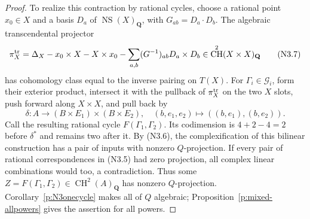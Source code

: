 \documentclass[11pt,reqno]{article}
\theoremstyle{emphasizedplain}
\theoremstyle{emphasizeddefinition}
\theoremstyle{emphasizeddefinition}
\DeclareMathOperator{\NS}{NS}
\DeclareMathOperator{\CH}{CH}
\newcommand{\Q}{\mathbf Q}
\begin{document}
\begin{proof}
To realize this contraction by rational cycles, choose a rational
point $x_0\in X$ and a basis $D_a$ of $\NS(X)_\Q$, with
$G_{ab}=D_a\cdot D_b$. The algebraic transcendental projector
\[
 \pi_X^{\rm tr}=\Delta_X-x_0\times X-X\times x_0
   -\sum_{a,b}(G^{-1})_{ab}D_a\times D_b
   \in\CH^2(X\times X)_\Q                          \tag{N3.7}
\]
has cohomology class equal to the inverse pairing on $T(X)$.
For $\Gamma_i\in\mathcal G_i$, form their exterior product,
intersect it with the pullback of $\pi_X^{\rm tr}$ on the two
$X$ slots, push forward along $X\times X$, and pull back by
\[
 \delta:A\longrightarrow(B\times E_1)\times(B\times E_2),
 \quad(b,e_1,e_2)\longmapsto((b,e_1),(b,e_2)).
\]
Call the resulting rational cycle $F(\Gamma_1,\Gamma_2)$.
Its codimension is $4+2-4=2$ before $\delta^*$ and remains two
after it. By (N3.6), the complexification of this bilinear
construction has a pair of inputs with nonzero $Q$-projection.
If every pair of rational correspondences in (N3.5) had zero
projection, all complex linear combinations would too, a
contradiction. Thus some
$Z=F(\Gamma_1,\Gamma_2)\in\CH^2(A)_\Q$ has nonzero
$Q$-projection. Corollary~\ref{p:N3onecycle} makes all of $Q$
algebraic; Proposition~\ref{p:mixed-allpowers} gives the assertion
for all powers.\qedhere
\end{proof}
\end{document}

